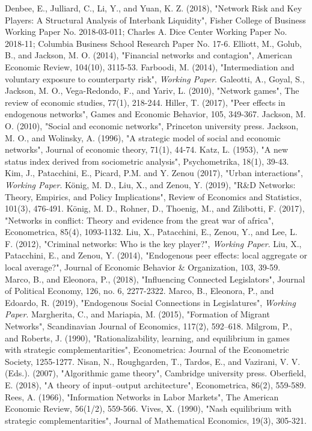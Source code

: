 \documentclass[12pt]{article}
\theoremstyle{definition}
\begin{document}
\begin{thebibliography}{99}
\bibitem{}
	Denbee, E., Julliard, C., Li, Y., and Yuan, K. Z. (2018),
	"Network Risk and Key Players: A Structural Analysis of Interbank Liquidity",
	Fisher College of Business Working Paper No. 2018-03-011;
	Charles A. Dice Center Working Paper No. 2018-11;
	Columbia Business School Research Paper No. 17-6. 
	Elliott, M., Golub, B., and Jackson, M. O. (2014),
	"Financial networks and contagion",
	American Economic Review, 104(10), 3115-53.
	Farboodi, M. (2014),
	"Intermediation and voluntary exposure to counterparty risk",
	\textit{Working Paper}.
\bibitem{}
	Galeotti, A., Goyal, S., Jackson, M. O., Vega-Redondo, F., and Yariv, L. (2010),
	"Network games",
	The review of economic studies, 77(1), 218-244.
	Hiller, T. (2017),
	"Peer effects in endogenous networks",
	Games and Economic Behavior, 105, 349-367.
	Jackson, M. O. (2010),
	"Social and economic networks",
	Princeton university press.
\bibitem{}
	Jackson, M. O., and Wolinsky, A. (1996),
	"A strategic model of social and economic networks",
	Journal of economic theory, 71(1), 44-74.
	Katz, L. (1953),
	"A new status index derived from sociometric analysis",
	Psychometrika, 18(1), 39-43.
	Kim, J., Patacchini, E., Picard, P.M. and Y. Zenou (2017),
	"Urban interactions",
	\textit{Working Paper}.
\bibitem{}
	K\"{o}nig, M. D., Liu, X., and Zenou, Y. (2019),
	"R\&D Networks: Theory, Empirics, and Policy Implications",
	Review of Economics and Statistics, 101(3), 476-491.
\bibitem{}
	K\"{o}nig, M. D., Rohner, D., Thoenig, M., and Zilibotti, F. (2017),
	"Networks in conflict: Theory and evidence from the great war of africa",
	Econometrica, 85(4), 1093-1132.
	Liu, X., Patacchini, E., Zenou, Y., and Lee, L. F. (2012),
	"Criminal networks: Who is the key player?",
	\textit{Working Paper}.
\bibitem{}
	Liu, X., Patacchini, E., and Zenou, Y. (2014),
	"Endogenous peer effects: local aggregate or local average?",
	Journal of Economic Behavior \& Organization, 103, 39-59.
\bibitem{}
	Marco, B., and Eleonora, P., (2018),
	"Influencing Connected Legislators",
	Journal of Political Economy, 126, no. 6, 2277-2322.
\bibitem{}
	Marco, B., Eleonora, P., and Edoardo, R. (2019),
	"Endogenous Social Connections in Legislatures",
	\textit{Working Paper}.
\bibitem{}
	Margherita, C., and Mariapia, M. (2015),
	"Formation of Migrant  Networks",
	Scandinavian Journal of Economics, 117(2), 592–618.
\bibitem{}
	Milgrom, P., and Roberts, J. (1990),
	"Rationalizability, learning, and equilibrium in games with strategic complementarities",
	Econometrica: Journal of the Econometric Society, 1255-1277.
	Nisan, N., Roughgarden, T., Tardos, E., and Vazirani, V. V. (Eds.). (2007),
	"Algorithmic game theory",
	Cambridge university press.
	Oberfield, E. (2018),
	"A theory of input–output architecture",
	Econometrica, 86(2), 559-589.
\bibitem{}
	Rees, A. (1966),
	"Information Networks in Labor Markets",
	The American Economic Review, 56(1/2), 559-566.
\bibitem{}
	Vives, X. (1990),
	"Nash equilibrium with strategic complementarities",
	Journal of Mathematical Economics, 19(3), 305-321.
\end{thebibliography}
\end{document}
